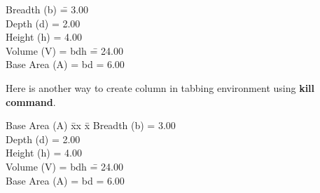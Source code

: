 \documentclass[11pt,a4paper]{article}
\begin{document}
    \begin{tabbing}
        Breadth (b)\hspace{.5cm} \= = 3.00\\
        Depth (d) \> = 2.00\\
        Height (h) \> = 4.00\\
        Volume (V) \> = bdh \= = 24.00\\
        Base Area (A) \> = bd \> = 6.00\\
    \end{tabbing}
    Here is another way to create column in tabbing environment using {\bf kill command}.\vspace{10mm}
    \begin{tabbing}
        Base Area (A) \= xx \= x\kill %
        Breadth (b)\hspace{.5cm} \> = 3.00\\
        Depth (d) \> = 2.00\\
        Height (h) \> = 4.00\\
        Volume (V) \> = bdh \= = 24.00\\
        Base Area (A) \> = bd \> = 6.00\\
    \end{tabbing}
\end{document}
